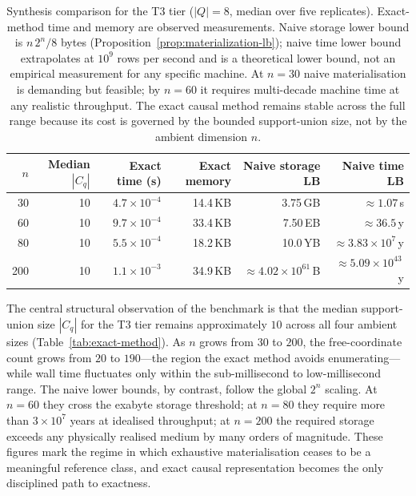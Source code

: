 \documentclass[11pt]{article}
\theoremstyle{definition}
\begin{document}
\begin{table}[h]
\centering
\small
\begin{tabular}{rrrrrr}
\toprule
\(n\) & Median \(|C_q|\) & Exact time (s) & Exact memory
      & Naive storage LB & Naive time LB \\
\midrule
 30 & 10 & \(4.7\times10^{-4}\) & 14.4\,KB
    & 3.75\,GB                  & \({\approx}1.07\)\,s \\
 60 & 10 & \(9.7\times10^{-4}\) & 33.4\,KB
    & 7.50\,EB                  & \({\approx}36.5\)\,y \\
 80 & 10 & \(5.5\times10^{-4}\) & 18.2\,KB
    & 10.0\,YB                  & \({\approx}3.83\times10^{7}\)\,y \\
200 & 10 & \(1.1\times10^{-3}\) & 34.9\,KB
    & \({\approx}4.02\times10^{61}\)\,B & \({\approx}5.09\times10^{43}\)\,y \\
\bottomrule
\end{tabular}
\caption{Synthesis comparison for the T3 tier (\(|Q|=8\), median over five replicates). Exact-method
time and memory are observed measurements. Naive storage lower bound is \(n\,2^n/8\) bytes
(Proposition~\ref{prop:materialization-lb}); naive time lower bound extrapolates at
\(10^9\) rows per second and is a theoretical lower bound, not an empirical measurement for any
specific machine. At \(n=30\) naive materialisation is demanding but feasible; by \(n=60\) it
requires multi-decade machine time at any realistic throughput. The exact causal method remains
stable across the full range because its cost is governed by the bounded support-union size, not
by the ambient dimension \(n\).}
\label{tab:synthesis}
\end{table}

The central structural observation of the benchmark is that the median support-union size \(|C_q|\)
for the T3 tier remains approximately \(10\) across all four ambient sizes (Table~\ref{tab:exact-method}).
As \(n\) grows from \(30\) to \(200\), the free-coordinate count grows from \(20\) to \(190\)---the
region the exact method avoids enumerating---while wall time fluctuates only within the
sub-millisecond to low-millisecond range. The naive lower bounds, by contrast, follow the global
\(2^n\) scaling. At \(n=60\) they cross the exabyte storage threshold; at \(n=80\) they require
more than \(3\times10^7\) years at idealised throughput; at \(n=200\) the required storage exceeds
any physically realised medium by many orders of magnitude. These figures mark the regime in which
exhaustive materialisation ceases to be a meaningful reference class, and exact causal
representation becomes the only disciplined path to exactness.
\end{document}
